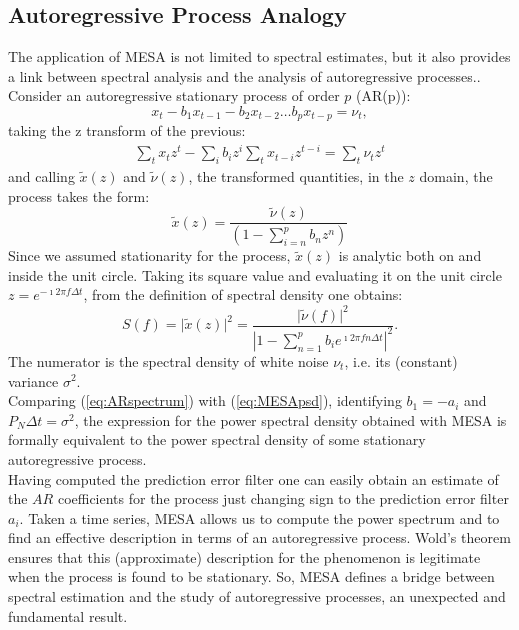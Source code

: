\documentclass[twocolumn,showpacs,preprintnumbers,nofootinbib,prd,
superscriptaddress,10pt]{revtex4-1}
\begin{document}
\subsection{Autoregressive Process Analogy} 
The application of MESA is not limited to spectral estimates, but it also provides a link between spectral analysis and the analysis
of autoregressive processes.\cite{doi:10.1029/RG013i001p00183}.
Consider an autoregressive stationary process of order $p$ (AR(p)): 
\begin{equation*}
    x_t - b_1 x_{t-1} - b_2 x_{t-2} \dots b_p x_{t - p} = \nu_t, 
\end{equation*}
taking the z transform of the previous: 
\begin{align}
    \sum_t x_t z^t - \sum_i b_i z^i\sum_t x_{t - i} z^{t - i} = \sum_t \nu_t z^t
\end{align}
and calling $\tilde x(z)$ and $\tilde \nu (z)$, the transformed quantities, 
in the $z$ domain, the process takes the form:
\begin{equation}
    \tilde x(z) = \frac{\tilde\nu(z)}{\left(1 - \sum_{i = n}^p b_n z^n \right)}
\end{equation}
Since we assumed stationarity for the process, $\tilde{x}(z)$ is analytic both on and inside the unit circle. Taking its square value and evaluating it on the unit circle $z = e^{-\imath 2 \pi f \Delta t}$, from the definition of spectral density one obtains:
\begin{equation}\label{eq:ARspectrum}
    S(f) = \vert \tilde x(z)\vert ^ 2 = 
    \frac{\vert \tilde \nu(f) \vert ^ 2}{\left\vert 1 - \sum_{n = 1}^p b_i e^{\imath 2 \pi f n \Delta t} \right\vert ^ 2}.
\end{equation}
The numerator is the spectral density of white noise $\nu_t$, i.e. its (constant) variance $\sigma^2$. \\ 
Comparing (\ref{eq:ARspectrum}) with (\ref{eq:MESApsd}), identifying $b_1 = - a_i$ and $P_N \Delta t= \sigma ^ 2$, the expression for the power spectral density obtained with MESA is formally equivalent to the power spectral density of some stationary autoregressive process. \\ 
Having computed the prediction error filter one can easily obtain an estimate of the $AR$ coefficients for the process just changing sign to the prediction error filter $a_i$.
Taken a time series, MESA allows us to compute the power spectrum and to find an effective description in terms of an autoregressive process. 
Wold's theorem ensures that this (approximate) description for the phenomenon is legitimate when the process is found to be stationary. So, MESA defines a bridge between spectral estimation and the study of autoregressive processes, an unexpected and fundamental result. \\
\end{document}
